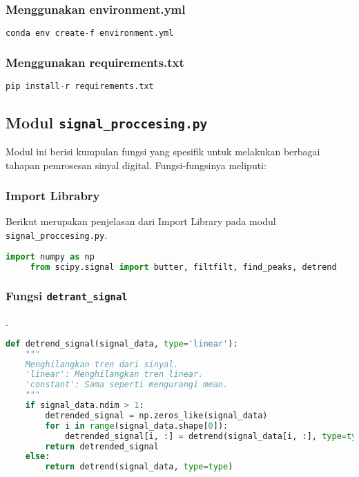 \documentclass[11pt,a4paper]{article}
\begin{document}
\subsubsection{Menggunakan environment.yml}
     \begin{lstlisting}[language=Python, caption=Install Library/Pustaka menggunakan environment.yml,label={labelkode}]
     conda env create-f environment.yml
    \end{lstlisting}

\subsubsection{Menggunakan requirements.txt}
     \begin{lstlisting}[language=Python, caption=Install Library/Pustaka menggunakan requirements.txt,label={labelkode}]
     pip install-r requirements.txt
    \end{lstlisting}
    
\subsection{Modul \texttt{signal\_proccesing.py}}
     Modul ini berisi kumpulan fungsi yang spesifik untuk melakukan berbagai tahapan pemrosesan sinyal digital. Fungsi-fungsinya meliputi:
     
\subsubsection{Import Librabry}
     Berikut merupakan penjelasan dari Import Library pada modul \texttt{signal\_proccesing.py}.
     \begin{lstlisting}[language=Python, caption=Import Library pada modul \texttt{signal\_proccesing.py},label={labelkode}]
     import numpy as np
     from scipy.signal import butter, filtfilt, find_peaks, detrend
    \end{lstlisting}

\subsubsection{Fungsi \texttt{detrant\_signal}}.
     \begin{lstlisting}[language=Python, caption=Fungsi \texttt{detrant\_signal},label={labelkode}]
    def detrend_signal(signal_data, type='linear'):
    """
    Menghilangkan tren dari sinyal.
    'linear': Menghilangkan tren linear.
    'constant': Sama seperti mengurangi mean.
    """
    if signal_data.ndim > 1:
        detrended_signal = np.zeros_like(signal_data)
        for i in range(signal_data.shape[0]):
            detrended_signal[i, :] = detrend(signal_data[i, :], type=type)
        return detrended_signal
    else:
        return detrend(signal_data, type=type)
    \end{lstlisting}
\end{document}
